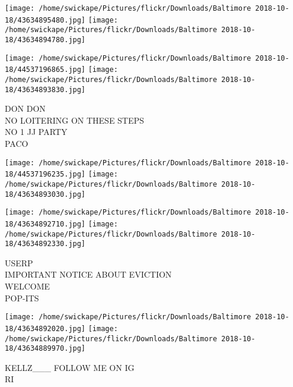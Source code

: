 \documentclass[10pt,letterpaper]{article}
\begin{document}
\texttt{[image: /home/swickape/Pictures/flickr/Downloads/Baltimore 2018-10-18/43634895480.jpg]}
\texttt{[image: /home/swickape/Pictures/flickr/Downloads/Baltimore 2018-10-18/43634894780.jpg]}

\texttt{[image: /home/swickape/Pictures/flickr/Downloads/Baltimore 2018-10-18/44537196865.jpg]}
\texttt{[image: /home/swickape/Pictures/flickr/Downloads/Baltimore 2018-10-18/43634893830.jpg]}

DON DON\\
NO LOITERING ON THESE STEPS\\
NO 1 JJ PARTY\\
PACO
\pagebreak

\texttt{[image: /home/swickape/Pictures/flickr/Downloads/Baltimore 2018-10-18/44537196235.jpg]}
\texttt{[image: /home/swickape/Pictures/flickr/Downloads/Baltimore 2018-10-18/43634893030.jpg]}

\texttt{[image: /home/swickape/Pictures/flickr/Downloads/Baltimore 2018-10-18/43634892710.jpg]}
\texttt{[image: /home/swickape/Pictures/flickr/Downloads/Baltimore 2018-10-18/43634892330.jpg]}

USERP\\
IMPORTANT NOTICE ABOUT EVICTION\\
WELCOME\\
POP{-}ITS
\pagebreak

\texttt{[image: /home/swickape/Pictures/flickr/Downloads/Baltimore 2018-10-18/43634892020.jpg]}
\texttt{[image: /home/swickape/Pictures/flickr/Downloads/Baltimore 2018-10-18/43634889970.jpg]}

KELLZ\_\_\_ FOLLOW ME ON IG\\
RI
\pagebreak
\end{document}
